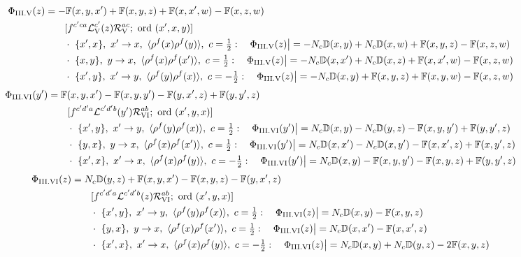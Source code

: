 \documentclass[10pt]{article}
\def\mf#1{\mathbb{#1}}
\begin{document}
\begin{align}
\Phi_{\rm III.V}(z)&=-\mf{F}(x,y,x')+\mf{F}(x,y,z)+\mf{F}(x,x',w)-\mf{F}(x,z,w)\notag\\&\qquad[f^{c'ca}\mathcal{L}_{\rm V}^{c'}(z)\mathcal{R}_{\rm V}^{ac};\ \text{ord}\ (x',x,y)]\notag\\
&\qquad\cdot\ \{x',x\},\ x'\to x,\ \langle\rho^{f}(x)\rho^{f}(y)\rangle,\ c=\tfrac{1}{2}:\quad \Phi_{\rm III.V}(z)\big|=-N_{c}\mf{D}(x,y)+N_{c}\mf{D}(x,w)+\mf{F}(x,y,z)-\mf{F}(x,z,w)\notag\\
&\qquad\cdot\ \{x,y\},\ y\to x,\ \langle\rho^{f}(x)\rho^{f}(x')\rangle,\ c=\tfrac{1}{2}:\quad \Phi_{\rm III.V}(z)\big|=-N_{c}\mf{D}(x,x')+N_{c}\mf{D}(x,z)+\mf{F}(x,x',w)-\mf{F}(x,z,w)\notag\\
&\qquad\cdot\ \{x',y\},\ x'\to y,\ \langle\rho^{f}(y)\rho^{f}(x)\rangle,\ c=-\tfrac{1}{2}:\quad \Phi_{\rm III.V}(z)\big|=-N_{c}\mf{D}(x,y)+\mf{F}(x,y,z)+\mf{F}(x,y,w)-\mf{F}(x,z,w)\notag
\end{align}
\begin{align}
\Phi_{\rm III.VI}(y')&=\mf{F}(x,y,x')-\mf{F}(x,y,y')-\mf{F}(y,x',z)+\mf{F}(y,y',z)\notag\\&\qquad[f^{c'd'a}\mathcal{L}^{c'd'b}(y')\mathcal{R}_{\rm VI}^{ab};\ \text{ord}\ (x',y,x)]\notag\\
&\qquad\cdot\ \{x',y\},\ x'\to y,\ \langle\rho^{f}(y)\rho^{f}(x)\rangle,\ c=\tfrac{1}{2}:\quad \Phi_{\rm III.VI}(y')\big|=N_{c}\mf{D}(x,y)-N_{c}\mf{D}(y,z)-\mf{F}(x,y,y')+\mf{F}(y,y',z)\notag\\
&\qquad\cdot\ \{y,x\},\ y\to x,\ \langle\rho^{f}(x)\rho^{f}(x')\rangle,\ c=\tfrac{1}{2}:\quad \Phi_{\rm III.VI}(y')\big|=N_{c}\mf{D}(x,x')-N_{c}\mf{D}(x,y')-\mf{F}(x,x',z)+\mf{F}(x,y',z)\notag\\
&\qquad\cdot\ \{x',x\},\ x'\to x,\ \langle\rho^{f}(x)\rho^{f}(y)\rangle,\ c=-\tfrac{1}{2}:\quad \Phi_{\rm III.VI}(y')\big|=N_{c}\mf{D}(x,y)-\mf{F}(x,y,y')-\mf{F}(x,y,z)+\mf{F}(y,y',z)\notag
\end{align}
\begin{align}
\Phi_{\rm III.VI}(z)&=N_{c}\mf{D}(y,z)+\mf{F}(x,y,x')-\mf{F}(x,y,z)-\mf{F}(y,x',z)\notag\\&\qquad[f^{c'd'a}\mathcal{L}^{c'd'b}(z)\mathcal{R}_{\rm VI}^{ab};\ \text{ord}\ (x',y,x)]\notag\\
&\qquad\cdot\ \{x',y\},\ x'\to y,\ \langle\rho^{f}(y)\rho^{f}(x)\rangle,\ c=\tfrac{1}{2}:\quad \Phi_{\rm III.VI}(z)\big|=N_{c}\mf{D}(x,y)-\mf{F}(x,y,z)\notag\\
&\qquad\cdot\ \{y,x\},\ y\to x,\ \langle\rho^{f}(x)\rho^{f}(x')\rangle,\ c=\tfrac{1}{2}:\quad \Phi_{\rm III.VI}(z)\big|=N_{c}\mf{D}(x,x')-\mf{F}(x,x',z)\notag\\
&\qquad\cdot\ \{x',x\},\ x'\to x,\ \langle\rho^{f}(x)\rho^{f}(y)\rangle,\ c=-\tfrac{1}{2}:\quad \Phi_{\rm III.VI}(z)\big|=N_{c}\mf{D}(x,y)+N_{c}\mf{D}(y,z)-2\mf{F}(x,y,z)\notag
\end{align}
\end{document}
